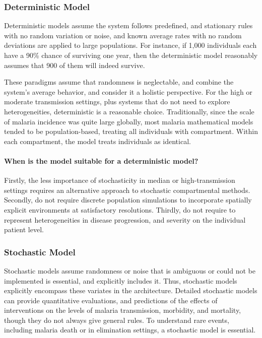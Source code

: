 \documentclass[a4paper, 12pt, twoside]{report}
\begin{document}


\subsubsection{Deterministic Model}%
\label{par:deterministic_model}

Deterministic models assume the system follows predefined, and stationary rules with no random variation or noise, and known average rates with no random deviations are applied to large populations.
For instance, if 1,000 individuals each have a 90\% chance of surviving one year, then the deterministic model reasonably assumes that 900 of them will indeed survive.

These paradigms assume that randomness is neglectable, and combine the system’s average behavior, and consider it a holistic perspective.
For the high or moderate transmission settings, plus systems that do not need to explore heterogeneities, deterministic is a reasonable choice.
Traditionally, since the scale of malaria incidence was quite large globally, most malaria mathematical models tended to be population-based, treating all individuals with compartment.
Within each compartment, the model treats individuals as identical.

\paragraph{When is the model suitable for a deterministic model?}%
\label{par:when_the_model_is_suitable_for_deterministic_model_}
Firstly, the less importance of stochasticity in median or high-transmission settings requires an alternative approach to stochastic compartmental methods.
Secondly, do not require discrete population simulations to incorporate spatially explicit environments at satisfactory resolutions.
Thirdly, do not require to represent heterogeneities in disease progression, and severity on the individual patient level.

\subsubsection{Stochastic Model}
\label{par:stochastic_model}
Stochastic models assume randomness or noise that is ambiguous or could not be implemented is essential, and explicitly includes it.
Thus, stochastic models explicitly encompass these variates in the architecture.
Detailed stochastic models can provide quantitative evaluations, and predictions of the effects of interventions on the levels of malaria transmission, morbidity, and mortality, though they do not always give general rules.
To understand rare events, including malaria death or in elimination settings, a stochastic model is essential.
\end{document}
